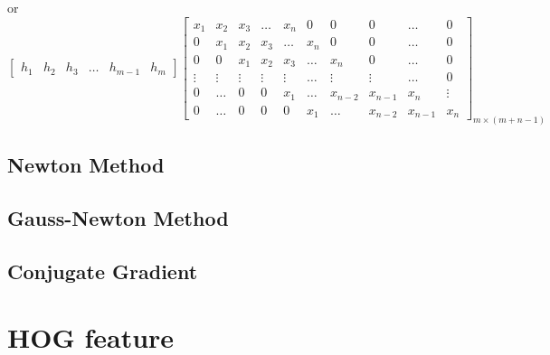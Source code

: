 \documentclass[12pt]{article}
\numberwithin{equation}{section}
\begin{document}
or 
\begin{equation}
            \begin{bmatrix}
                h_1 & h_2 & h_3 & \ldots & h_{m-1} & h_m
            \end{bmatrix}
            \begin{bmatrix}
                x_1 & x_2 & x_3 & \ldots & x_n & 0 & 0 & 0& \ldots & 0 \\
                0 & x_1 & x_2 & x_3 & \ldots & x_n & 0 & 0 & \ldots & 0 \\
                0 & 0 & x_1 & x_2 & x_3 & \ldots & x_n & 0  & \ldots & 0 \\
                \vdots & \vdots & \vdots & \vdots & \vdots & \ldots & \vdots & \vdots  & \ldots & 0 \\
                0 & \ldots & 0 & 0 & x_1 & \ldots & x_{n-2} & x_{n-1} & x_n & \vdots \\
                0 & \ldots & 0 & 0 & 0 & x_1 & \ldots & x_{n-2} & x_{n-1} & x_n
            \end{bmatrix}_{m \times (m+n-1)}
\end{equation}
\subsection{Newton Method} \label{ch:newtonmethod}

\subsection{Gauss-Newton Method} \label{ch:gaussnewton}

\subsection{Conjugate Gradient \cite{shewchuk1994introduction}} \label{ch:conjugategradient}
\section{HOG feature \cite{dalal2005histograms} \cite{felzenszwalb2010object}} 
\end{document}
